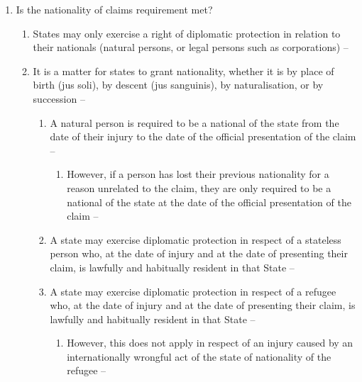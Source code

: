 \begin{enumerate}
\begin{enumerate}
    \end{enumerate}
    \item Is the nationality of claims requirement met?
    \begin{enumerate}
        \item States may only exercise a right of diplomatic protection in relation to their nationals (natural persons, or legal persons such as corporations) -- 
        \item It is a matter for states to grant nationality, whether it is by place of birth (jus soli), by descent (jus sanguinis), by naturalisation, or by succession -- 
        \begin{enumerate}
            \item A natural person is required to be a national of the state from the date of their injury to the date of the official presentation of the claim -- 
            \begin{enumerate}
                \item However, if a person has lost their previous nationality for a reason unrelated to the claim, they are only required to be a national of the state at the date of the official presentation of the claim -- 
            \end{enumerate}
            \item A state may exercise diplomatic protection in respect of a stateless person who, at the date of injury and at the date of presenting their claim, is lawfully and habitually resident in that State -- 
            \item A state may exercise diplomatic protection in respect of a refugee who, at the date of injury and at the date of presenting their claim, is lawfully and habitually resident in that State -- 
            \begin{enumerate}
                \item However, this does not apply in respect of an injury caused by an internationally wrongful act of the state of nationality of the refugee -- 

\end{enumerate}
\end{enumerate}
\end{enumerate}
\end{enumerate}
